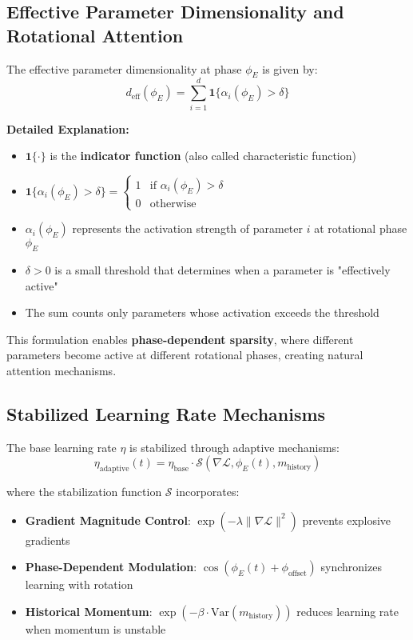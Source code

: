 \subsection{Effective Parameter Dimensionality and Rotational Attention}

The effective parameter dimensionality at phase $\phi_E$ is given by:
\begin{equation}
d_{\text{eff}}(\phi_E) = \sum_{i=1}^{d} \mathbf{1}\{\alpha_i(\phi_E) > \delta\}
\end{equation}

\textbf{Detailed Explanation:}
\begin{itemize}
    \item $\mathbf{1}\{\cdot\}$ is the \textbf{indicator function} (also called characteristic function)
    \item $\mathbf{1}\{\alpha_i(\phi_E) > \delta\} = \begin{cases} 1 & \text{if } \alpha_i(\phi_E) > \delta \\ 0 & \text{otherwise} \end{cases}$
    \item $\alpha_i(\phi_E)$ represents the activation strength of parameter $i$ at rotational phase $\phi_E$
    \item $\delta > 0$ is a small threshold that determines when a parameter is "effectively active"
    \item The sum counts only parameters whose activation exceeds the threshold
\end{itemize}

This formulation enables \textbf{phase-dependent sparsity}, where different parameters become active at different rotational phases, creating natural attention mechanisms.

\subsection{Stabilized Learning Rate Mechanisms}

The base learning rate $\eta$ is stabilized through adaptive mechanisms:
\begin{equation}
\eta_{\text{adaptive}}(t) = \eta_{\text{base}} \cdot \mathcal{S}(\nabla \mathcal{L}, \phi_E(t), m_{\text{history}})
\end{equation}

where the stabilization function $\mathcal{S}$ incorporates:
\begin{itemize}
    \item \textbf{Gradient Magnitude Control}: $\exp(-\lambda \|\nabla \mathcal{L}\|^2)$ prevents explosive gradients
    \item \textbf{Phase-Dependent Modulation}: $\cos(\phi_E(t) + \phi_{\text{offset}})$ synchronizes learning with rotation
    \item \textbf{Historical Momentum}: $\exp(-\beta \cdot \text{Var}(m_{\text{history}}))$ reduces learning rate when momentum is unstable
\end{itemize}

